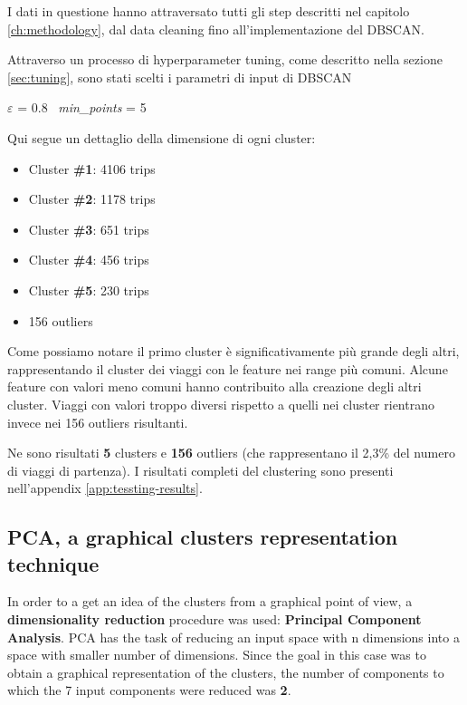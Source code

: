 I dati in questione hanno attraversato tutti gli step descritti nel capitolo \ref{ch:methodology}, dal data cleaning fino all'implementazione del DBSCAN.

Attraverso un processo di hyperparameter tuning, come descritto nella sezione \ref{sec:tuning}, sono stati scelti i parametri di input di DBSCAN 

\begin{center} 
    $\varepsilon$ = 0.8 \, \textit{min\_points} = 5
\end{center} 

Qui segue un dettaglio della dimensione di ogni cluster:
\begin{itemize}
\item Cluster \textbf{\#1}: 4106 trips
\item Cluster \textbf{\#2}: 1178 trips
\item Cluster \textbf{\#3}: 651 trips
\item Cluster \textbf{\#4}: 456 trips
\item Cluster \textbf{\#5}: 230 trips
\item 156 outliers
\end{itemize}

Come possiamo notare il primo cluster è significativamente più grande degli altri, rappresentando il cluster dei viaggi con le feature nei range più comuni. Alcune feature con valori meno comuni hanno contribuito alla creazione degli altri cluster. Viaggi con valori troppo diversi rispetto a quelli nei cluster rientrano invece nei 156 outliers risultanti.

Ne sono risultati \textbf{5} clusters e \textbf{156} outliers (che rappresentano il 2,3\% del numero di viaggi di partenza). I risultati completi del clustering sono presenti nell'appendix \ref{app:tessting-results}.

\clearpage
\subsection{PCA, a graphical clusters representation technique}
\label{sec:pca}

In order to a get an idea of the clusters from a graphical point of view, a \textbf{dimensionality reduction} procedure was used: \textbf{Principal Component Analysis}.
PCA has the task of reducing an input space with n dimensions into a space with smaller number of dimensions.
Since the goal in this case was to obtain a graphical representation of the clusters, the number of components to which the 7 input components were reduced was \textbf{2}.

